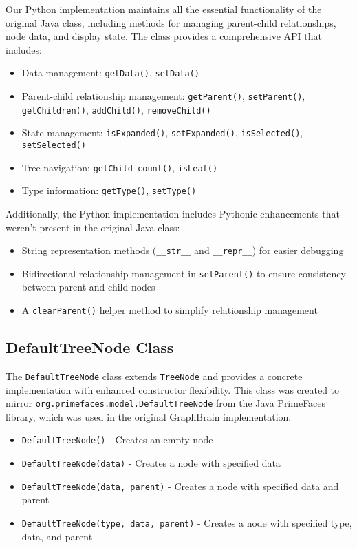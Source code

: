 \documentclass[12pt,a4paper]{article}
\begin{document}
Our Python implementation maintains all the essential functionality of the original Java class, including methods for managing parent-child relationships, node data, and display state. The class provides a comprehensive API that includes:

\begin{itemize}
    \item Data management: \texttt{getData()}, \texttt{setData()}
    \item Parent-child relationship management: \texttt{getParent()}, \texttt{setParent()}, \texttt{getChildren()}, \texttt{addChild()}, \texttt{removeChild()}
    \item State management: \texttt{isExpanded()}, \texttt{setExpanded()}, \texttt{isSelected()}, \texttt{setSelected()}
    \item Tree navigation: \texttt{getChild\_count()}, \texttt{isLeaf()}
    \item Type information: \texttt{getType()}, \texttt{setType()}
\end{itemize}

Additionally, the Python implementation includes Pythonic enhancements that weren't present in the original Java class:

\begin{itemize}
    \item String representation methods (\texttt{\_\_str\_\_} and \texttt{\_\_repr\_\_}) for easier debugging
    \item Bidirectional relationship management in \texttt{setParent()} to ensure consistency between parent and child nodes
    \item A \texttt{clearParent()} helper method to simplify relationship management
\end{itemize}



\subsection{DefaultTreeNode Class}
The \texttt{DefaultTreeNode} class extends \texttt{TreeNode} and provides a concrete implementation with enhanced constructor flexibility. This class was created to mirror \texttt{org.primefaces.model.DefaultTreeNode} from the Java PrimeFaces library, which was used in the original GraphBrain implementation.


\begin{itemize}
    \item \texttt{DefaultTreeNode()} - Creates an empty node
    \item \texttt{DefaultTreeNode(data)} - Creates a node with specified data
    \item \texttt{DefaultTreeNode(data, parent)} - Creates a node with specified data and parent
    \item \texttt{DefaultTreeNode(type, data, parent)} - Creates a node with specified type, data, and parent
\end{itemize}
\end{document}
